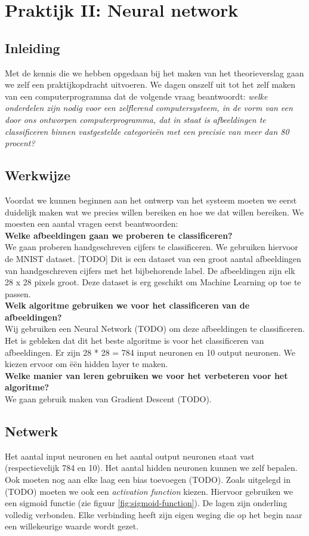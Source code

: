 \section{Praktijk II: Neural network}

\subsection{Inleiding}
Met de kennis die we hebben opgedaan bij het maken van het theorieverslag gaan we zelf een praktijkopdracht uitvoeren. We dagen onszelf uit tot het zelf maken van een computerprogramma dat de volgende vraag beantwoordt: \textit{welke onderdelen zijn nodig voor een zelflerend computersysteem, in de vorm van een door ons ontworpen computerprogramma, dat in staat is afbeeldingen te classificeren binnen vastgestelde categorie\"en met een precisie van meer dan 80 procent?}

\subsection{Werkwijze}
Voordat we kunnen beginnen aan het ontwerp van het systeem moeten we eerst duidelijk maken wat we precies willen bereiken en hoe we dat willen bereiken. We moesten een aantal vragen eerst beantwoorden:\\
\textbf{Welke afbeeldingen gaan we proberen te classificeren?}\\
We gaan proberen handgeschreven cijfers te classificeren. We gebruiken hiervoor de MNIST dataset. [TODO] Dit is een dataset van een groot aantal afbeeldingen van handgeschreven cijfers met het bijbehorende label. De afbeeldingen zijn elk 28 x 28 pixels groot. Deze dataset is erg geschikt om Machine Learning op toe te passen.\\
\textbf{Welk algoritme gebruiken we voor het classificeren van de afbeeldingen?}\\
Wij gebruiken een Neural Network (TODO) om deze afbeeldingen te classificeren. Het is gebleken dat dit het beste algoritme is voor het classificeren van afbeeldingen. Er zijn 28 * 28 = 784 input neuronen en 10 output neuronen. We kiezen ervoor om \"e\"en hidden layer te maken.\\
\textbf{Welke manier van leren gebruiken we voor het verbeteren voor het algoritme?}\\
We gaan gebruik maken van Gradient Descent (TODO).

\subsection{Netwerk}
Het aantal input neuronen en het aantal output neuronen staat vast (respectievelijk 784 en 10). Het aantal hidden neuronen kunnen we zelf bepalen. Ook moeten nog aan elke laag een bias toevoegen (TODO). Zoals uitgelegd in (TODO) moeten we ook een \textit{activation function} kiezen. Hiervoor gebruiken we een sigmoid functie (zie figuur \ref{fig:sigmoid-function}). De lagen zijn onderling volledig verbonden. Elke verbinding heeft zijn eigen weging die op het begin naar een willekeurige waarde wordt gezet.

